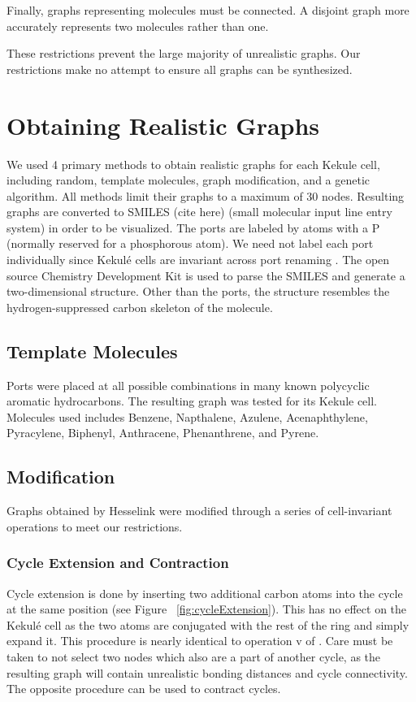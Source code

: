 \documentclass[12pt]{article}
\begin{document}
Finally, graphs representing molecules must be connected. A disjoint graph more accurately represents two molecules rather than one. 

These restrictions prevent the large majority of unrealistic graphs. Our restrictions make no attempt to ensure all graphs can be synthesized. 

\section{Obtaining Realistic Graphs}

We used 4 primary methods to obtain realistic graphs for each Kekule cell, including random, template molecules, graph modification, and a genetic algorithm. All methods limit their graphs to a maximum of 30 nodes. Resulting graphs are converted to SMILES (cite here) (small molecular input line entry system) in order to be visualized. The ports are labeled by atoms with a P (normally reserved for a phosphorous atom). We need not label each port individually since Kekul\'e cells are invariant across port renaming \cite{H13}. The open source Chemistry Development Kit \cite{CDK} is used to parse the SMILES and generate a two-dimensional structure. Other than the ports, the structure resembles the hydrogen-suppressed carbon skeleton of the molecule.  

\subsection{Template Molecules}

Ports were placed at all possible combinations in many known polycyclic aromatic hydrocarbons. The resulting graph was tested for its Kekule cell. Molecules used includes Benzene, Napthalene, Azulene, Acenaphthylene, Pyracylene, Biphenyl, Anthracene, Phenanthrene, and Pyrene.

\subsection{Modification}

Graphs obtained by Hesselink \cite{H13} were modified through a series of cell-invariant operations to meet our restrictions. 

\subsubsection{Cycle Extension and Contraction}
Cycle extension is done by inserting two additional carbon atoms into the cycle at the same position (see Figure ~\ref{fig:cycleExtension}). This has no effect on the Kekul\'e cell as the two atoms are conjugated with the rest of the ring and simply expand it. This procedure is nearly identical to operation v of \cite{v06}. Care must be taken to not select two nodes which also are a part of another cycle, as the resulting graph will contain unrealistic bonding distances and cycle connectivity. The opposite procedure can be used to contract cycles.
\end{document}
